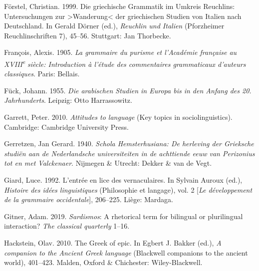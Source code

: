 \begin{styleStandard}
Förstel, Christian. 1999. Die griechische Grammatik im Umkreis Reuchlins: Untersuchungen zur {\textgreater}Wanderung{\textless} der griechischen Studien von Italien nach Deutschland. In Gerald Dörner (ed.), \textit{Reuchlin und Italien} (Pforzheimer Reuchlinschriften 7), 45–56. Stuttgart: Jan Thorbecke.
\end{styleStandard}

\begin{styleStandard}
François, Alexis. 1905. \textit{La grammaire du purisme et l’Académie française au XVIII}\textit{\textsuperscript{e}}\textit{ siècle: Introduction à l’étude des commentaires grammaticaux d’auteurs classiques}. Paris: Bellais.
\end{styleStandard}

\begin{styleStandard}
Fück, Johann. 1955. \textit{Die arabischen Studien in Europa bis in den Anfang des 20. Jahrhunderts}. Leipzig: Otto Harrassowitz.
\end{styleStandard}

\begin{styleStandard}
Garrett, Peter. 2010. \textit{Attitudes to language} (Key topics in sociolinguistics). Cambridge: Cambridge University Press.
\end{styleStandard}

\begin{styleStandard}
Gerretzen, Jan Gerard. 1940. \textit{Schola Hemsterhusiana: De herleving der Grieksche studiën aan de Nederlandsche universiteiten in de achttiende eeuw van Perizonius tot en met Valckenaer}. Nijmegen \& Utrecht: Dekker \& van de Vegt.
\end{styleStandard}

\begin{styleStandard}
Giard, Luce. 1992. L’entrée en lice des vernaculaires. In Sylvain Auroux (ed.), \textit{Histoire des idées linguistiques} (Philosophie et langage), vol. 2 [\textit{Le développement de la grammaire occidentale}], 206–225. Liège: Mardaga.
\end{styleStandard}

\begin{styleStandard}
Gitner, Adam. 2019. \textit{Sardismos}: A rhetorical term for bilingual or plurilingual interaction? \textit{The classical quarterly} 1–16.
\end{styleStandard}

\begin{styleStandard}
Hackstein, Olav. 2010. The Greek of epic. In Egbert J. Bakker (ed.), \textit{A companion to the Ancient Greek language} (Blackwell companions to the ancient world), 401–423. Malden, Oxford \& Chichester: Wiley-Blackwell.
\end{styleStandard}

